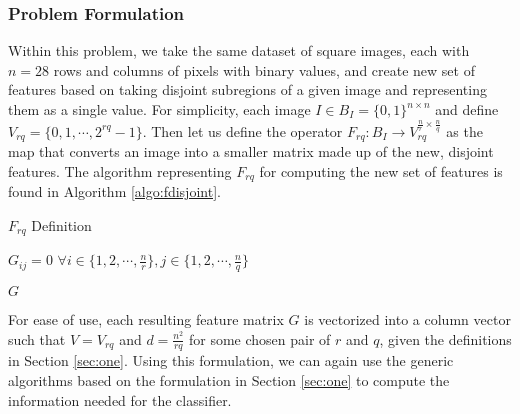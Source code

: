 \documentclass{article}[12pt]
\begin{document}
  \subsubsection{Problem Formulation} \label{sssec:disform}
  Within this problem, we take the same dataset of square images, each with $n = 28$ rows and columns of pixels with binary values, and create new set of features based on taking disjoint subregions of a given image and representing them as a single value. For simplicity, each image $I \in B_I = \lbrace 0,1 \rbrace^{n \times n}$ and define $V_{rq} = \lbrace 0, 1, \cdots, 2^{rq}-1 \rbrace$. Then let us define the operator $F_{rq}: B_I \rightarrow V_{rq}^{\frac{n}{r} \times \frac{n}{q}}$ as the map that converts an image into a smaller matrix made up of the new, disjoint features. The algorithm representing $F_{rq}$ for computing the new set of features is found in Algorithm \ref{algo:fdisjoint}.
  
  \begin{algorithm}[ht]
  	\caption{$F_{rq}$ Definition }
  	\;
  	
  	$G_{ij} = 0$  $\forall i \in \lbrace 1, 2, \cdots, \frac{n}{r}\rbrace, j \in \lbrace 1, 2, \cdots, \frac{n}{q} \rbrace $
  	\;
  	\;
  	
  	\;
  	
  	\Return $G$
  	\label{algo:fdisjoint}
  \end{algorithm}
  
  For ease of use, each resulting feature matrix $G$ is vectorized into a column vector such that $V = V_{rq} $ and $d = \frac{n^2}{rq}$ for some chosen pair of $r$ and $q$, given the definitions in Section \ref{sec:one}. Using this formulation, we can again use the generic algorithms based on the formulation in Section \ref{sec:one} to compute the information needed for the classifier.
  
\end{document}
